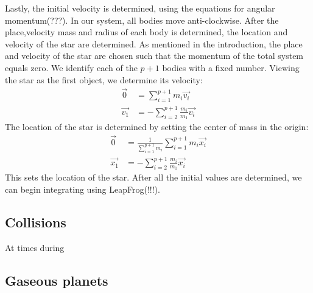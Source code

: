 Lastly, the initial velocity is determined, using the equations for angular momentum(???). 
In our system, all bodies move anti-clockwise. 
After the place,velocity mass and radius of each body is determined, the location and velocity of the star are determined. 
As mentioned in the introduction, the place and velocity of the star are chosen such that the momentum of the total system equals zero.
We identify each of the \(p+1\) bodies with a fixed number. Viewing the star  as the first object, we determine its velocity:
\begin{align*}
	\vec{0}&=\sum_{i=1}^{p+1}m_i\vec{v_i}\\
	\vec{v_1}&=-\sum_{i=2}^{p+1}\frac{m_i}{m_1}\vec{v_i}
\end{align*}
The location of the star is determined by setting the center of mass in the origin:
\begin{align*}
	\vec{0}&=\frac{1}{\sum_{i=1}^{p+1}m_i}\sum_{i=1}^{p+1}m_i\vec{x_i}\\
	\vec{x_1}&=-\sum_{i=2}^{p+1}\frac{m_i}{m_1}\vec{x_i}
\end{align*}
This sets the location of the star.
After all the initial values are determined, we can begin integrating using LeapFrog(!!!). 
\subsection{Collisions}
At times during 
\subsection{Gaseous planets}